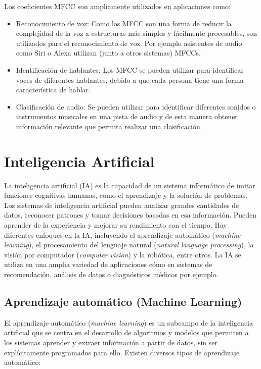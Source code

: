 Los coeficientes MFCC son ampliamente utilizados en aplicaciones como: 

\begin{itemize}
\tightlist
\item Reconocimiento de voz: Como los MFCC son una forma de reducir la complejidad de la voz a estructuras más simples y fácilmente procesables, son utilizados para el reconocimiento de voz. Por ejemplo asistentes de audio como Siri o Alexa utilizan (junto a otros sistemas) MFCCs. \cite{Kiran_2021}
\item Identificación de hablantes: Los MFCC se pueden utilizar para identificar voces de diferentes hablantes, debido a que cada persona tiene una forma característica de hablar. \cite{Kiran_2021} \cite{Nakagawa_Wang}
\item Clasificación de audio: Se pueden utilizar para identificar diferentes sonidos o instrumentos musicales en una pista de audio y de esta manera obtener información relevante que permita realizar una clasificación. \cite{Wu}
\end{itemize}


\newpage

\section{Inteligencia Artificial}

La inteligencia artificial (IA) es la capacidad de un sistema informático de imitar funciones cognitivas humanas, como el aprendizaje y la solución de problemas. Los sistemas de inteligencia artificial pueden analizar grandes cantidades de datos, reconocer patrones y tomar decisiones basadas en esa información. Pueden aprender de la experiencia y mejorar su rendimiento con el tiempo. Hay diferentes enfoques en la IA, incluyendo el aprendizaje automático (\textit{machine learning}), el procesamiento del lenguaje natural (\textit{natural language processing}), la visión por computador (\textit{computer vision}) y la robótica, entre otros. La IA se utiliza en una amplia variedad de aplicaciones cómo en sistemas de recomendación, análisis de datos o diagnósticos médicos por ejemplo.

\subsection{Aprendizaje automático (Machine Learning)}
El aprendizaje automático (\textit{machine learning}) es un subcampo de la inteligencia artificial que se centra en el desarrollo de algoritmos y modelos que permiten a los sistemas aprender y extraer información a partir de datos, sin ser explícitamente programados para ello.
Existen diversos tipos de aprendizaje automático:

